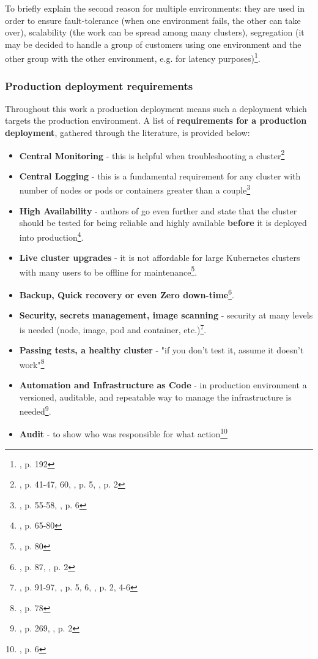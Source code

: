 To briefly explain the second reason for multiple environments: they are used in order to ensure fault-tolerance (when one environment fails, the other can take over), scalability (the work can be spread among many clusters), segregation (it may be decided to handle a group of customers using one environment and the other group with the other environment, e.g. for latency purposes)\footnote{\cite{book-iac}, p. 192}.

\subsubsection{Production deployment requirements}
Throughout this work a production deployment means such a deployment which targets the production environment. A list of \textbf{requirements for a production deployment}, gathered through the literature, is provided below:
\begin{itemize}
\item \textbf{Central Monitoring} - this is helpful when troubleshooting a cluster\footnote{\cite{book-mastering-k8s}, p. 41-47, 60, \cite{online-weave-checklists}, p. 5, \cite{online-weave-guide}, p. 2}
\item \textbf{Central Logging} - this is a fundamental requirement for any cluster with number of nodes or pods or containers greater than a couple\footnote{\cite{book-mastering-k8s}, p. 55-58, \cite{online-weave-checklists}, p. 6}
\item \textbf{High Availability} - authors of \cite{book-mastering-k8s} go even further and state that the cluster should be tested for being reliable and highly available \textbf{before} it is deployed into production\footnote{\cite{book-mastering-k8s}, p. 65-80}.
\item \textbf{Live cluster upgrades} - it is not affordable for large Kubernetes clusters with many users to be offline for maintenance\footnote{\cite{book-mastering-k8s}, p. 80}.
\item \textbf{Backup, Quick recovery or even Zero down-time}\footnote{\cite{book-mastering-k8s}, p. 87, \cite{online-weave-guide}, p. 2}.
\item \textbf{Security, secrets management, image scanning} - security at many levels is needed (node, image, pod and container, etc.)\footnote{\cite{book-mastering-k8s}, p. 91-97, \cite{online-weave-checklists}, p. 5, 6, \cite{online-weave-guide}, p. 2, 4-6}.
\item \textbf{Passing tests, a healthy cluster} - "if you don't test it, assume it doesn't work"\footnote{\cite{book-mastering-k8s}, p. 78}
\item \textbf{Automation and Infrastructure as Code} - in production environment a versioned, auditable, and repeatable way to manage the infrastructure is needed\footnote{\cite{book-mastering-k8s}, p. 269, \cite{online-weave-guide}, p. 2}.
\item \textbf{Audit} - to show who was responsible for what action\footnote{\cite{online-weave-guide}, p. 6}
\end{itemize}

